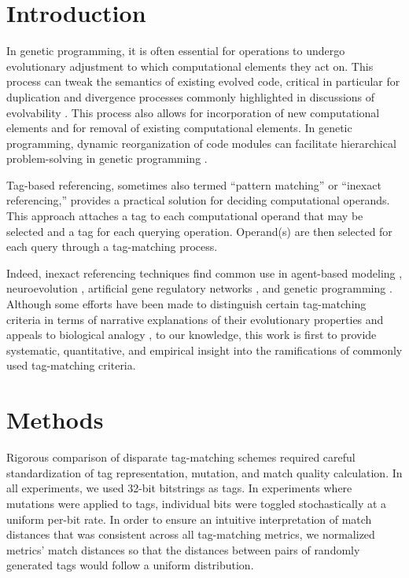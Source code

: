 \section{Introduction} \label{sec:introduction}

In genetic programming, it is often essential for operations to undergo evolutionary adjustment to which computational elements they act on.
This process can tweak the semantics of existing evolved code, critical in particular for duplication and divergence processes commonly highlighted in discussions of evolvability \citep{altenberg1994evolution}.
This process also allows for incorporation of new computational elements and for removal of existing computational elements.
In genetic programming, dynamic reorganization of code modules can facilitate hierarchical problem-solving in genetic programming \citep{Kinnear:Koza:1994:adf}.

Tag-based referencing, sometimes also termed ``pattern matching'' or ``inexact referencing,'' provides a practical solution for deciding computational operands.
This approach attaches a tag to each computational operand that may be selected and a tag for each querying operation.
Operand(s) are then selected for each query through a tag-matching process.

Indeed, inexact referencing techniques find common use in agent-based modeling \citep{riolo2001evolution}, neuroevolution \citep{reisinger2007acquiring}, artificial gene regulatory networks \citep{banzhaf2003artificial}, and genetic programming \citep{spector2011tag, lalejini2018evolving}.
Although some efforts have been made to distinguish certain tag-matching criteria in terms of narrative explanations of their evolutionary properties and appeals to biological analogy \citep{downing2015intelligence,scherer2004activation}, to our knowledge, this work is first to provide systematic, quantitative, and empirical insight into the ramifications of commonly used tag-matching criteria.

\section{Methods}

Rigorous comparison of disparate tag-matching schemes required careful standardization of tag representation, mutation, and match quality calculation.
In all experiments, we used 32-bit bitstrings as tags.
In experiments where mutations were applied to tags, individual bits were toggled stochastically at a uniform per-bit rate.
In order to ensure an intuitive interpretation of match distances that was consistent across all tag-matching metrics, we normalized metrics' match distances so that the distances between pairs of randomly generated tags would follow a uniform distribution.


